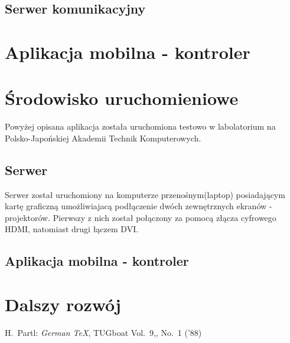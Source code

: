 \documentclass[12pt]{article}
\begin{document}
\subsection{Serwer komunikacyjny}
\section{Aplikacja mobilna - kontroler}

\section{Środowisko uruchomieniowe}
Powyżej opisana aplikacja została uruchomiona testowo w labolatorium na Polsko-Japońskiej Akademii Technik Komputerowych.

\subsection{Serwer}
Serwer został uruchomiony na komputerze przenośnym(laptop) posiadającym kartę graficzną umożliwiajacą podłączenie dwóch zewnętrznych ekranów - projektorów. Pierwszy z nich został połączony za pomocą złącza cyfrowego HDMI, natomiast drugi łączem DVI.
\subsection{Aplikacja mobilna - kontroler}

\section{Dalszy rozwój}

 
\newpage
\thispagestyle{empty}
 
  
\listoffigures
 
\listoftables
\begin{thebibliography}{99}
 H.~Partl:
\emph{German \TeX},
TUGboat Vol.~9,, No.~1 ('88)
\end{thebibliography}
\end{document}
